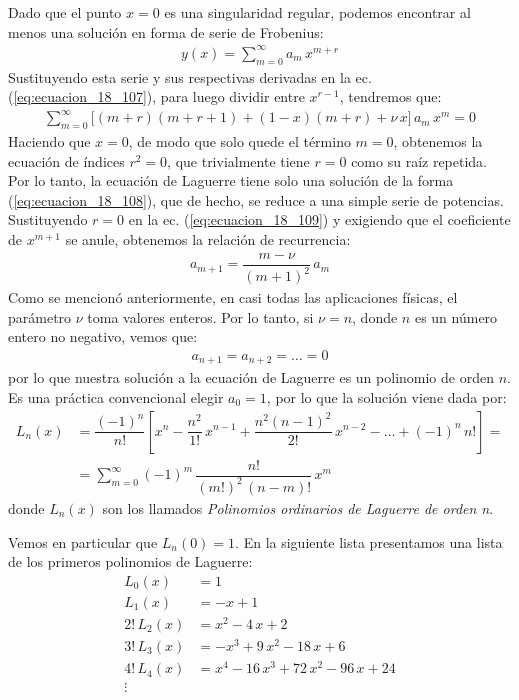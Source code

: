 Dado que el punto $x = 0$ es una singularidad regular, podemos encontrar al menos una solución en forma de serie de Frobenius:
\begin{align}
y(x) = \sum_{m=0}^{\infty} a_{m} \, x^{m+r}
\label{eq:ecuacion_18_108}
\end{align}
Sustituyendo esta serie y sus respectivas derivadas en la ec. (\ref*{eq:ecuacion_18_107}), para luego dividir entre $x^{r-1}$, tendremos que:
\begin{align}
\sum_{m=0}^{\infty} \big[ (m + r)(m + r + 1) + (1 - x)(m + r) + \nu \, x \big] \, a_{m} \, x^{m} = 0
\label{eq:ecuacion_18_109}
\end{align}
Haciendo que $x = 0$, de modo que solo quede el término $m = 0$, obtenemos la ecuación de índices $r^{2} = 0$, que trivialmente tiene $r = 0$ como su raíz repetida. Por lo tanto, la ecuación de Laguerre tiene solo una solución de la forma (\ref{eq:ecuacion_18_108}), que de hecho, se reduce a una simple serie de potencias. Sustituyendo $r = 0$ en la ec. (\ref{eq:ecuacion_18_109}) y exigiendo que el coeficiente de $x^{m+1}$ se anule, obtenemos la relación de recurrencia:
\begin{align}
a_{m+1} = \dfrac{m - \nu}{(m + 1)^{2}} \, a_{m}
\end{align}
Como se mencionó anteriormente, en casi todas las aplicaciones físicas, el parámetro $\nu$ toma valores enteros. Por lo tanto, si $\nu = n$, donde $n$ es un número entero no negativo, vemos que:
\begin{align*}
a_{n+1} = a_{n+2} =\ldots = 0
\end{align*}
por lo que nuestra solución a la ecuación de Laguerre es un polinomio de orden $n$. Es una práctica convencional elegir $a_{0} = 1$, por lo que la solución viene dada por:
\begin{align}
L_{n} (x) &= \dfrac{(-1)^{n}}{n!} \left[ x^{n} - \dfrac{n^{2}}{1!} \, x^{n-1} + \dfrac{n^{2}(n - 1)^{2}}{2!} \, x^{n-2} - \ldots + (-1)^{n} \, n! \right] = \label{eq:ecuacion_18_110} \\[0.5em]
&= \sum_{m=0}^{\infty} (-1)^{m} \, \dfrac{n!}{(m!)^{2} \, (n - m)!} \, x^{m} \label{eq:ecuacion_18_111}
\end{align}
donde $L_{n}(x)$ son los llamados \emph{Polinomios ordinarios de Laguerre de orden n}.
\par
Vemos en particular que $L_{n}(0) = 1$. En la siguiente lista presentamos una lista de los primeros polinomios de Laguerre:
\begin{align*}
L_{0} (x) &= 1 \\[0.5em]
L_{1} (x) &= -x + 1 \\[0.5em]
2! \, L_{2} (x) &= x^{2} - 4 \, x + 2 \\[0.5em]
3! \, L_{3} (x) &= -x^{3} + 9 \, x^{2} - 18 \, x + 6 \\[0.5em]
4! \, L_{4} (x) &= x^{4} -16 \, x^{3} + 72 \, x^{2} - 96 \, x + 24 \\[0.5em]
\vdots
\end{align*}
